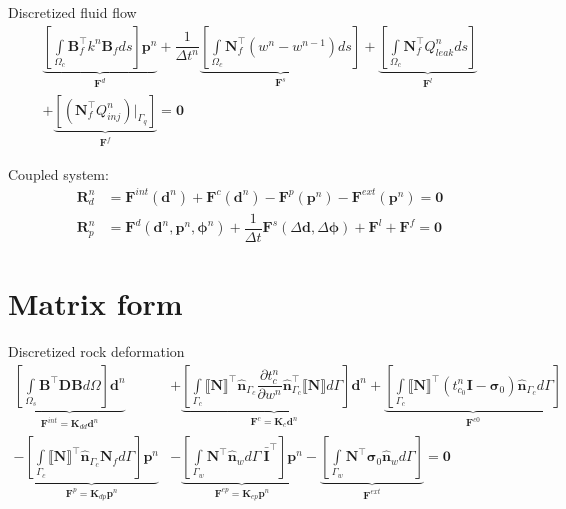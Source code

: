 \documentclass{article}
\begin{document}
Discretized fluid flow
\begin{equation}
\begin{gathered}
\underbrace{\left[\int\limits_{\Omega_c}
	\mathbf{B}_f^\top k^n \mathbf{B}_f ds \right] \mathbf{p}^n
	}_{\mathbf{F}^d}
+
\dfrac{1}{\Delta t^n}
\underbrace{\left[
	\int\limits_{\Omega_c} \mathbf{N}_f^\top (w^n - w^{n-1})  ds 
	\right]}_{\mathbf{F}^s}
+
\underbrace{\left[
	\int\limits_{\Omega_c} \mathbf{N}_f^{\top} Q_{leak}^n ds
	\right]}_{\mathbf{F}^l}
	\\
+
\underbrace{\left[
	\left(\mathbf{N}_f^{\top} Q_{inj}^n \right) \Big\rvert_{\Gamma_q} 
	\right]}_{\mathbf{F}^f}
= \mathbf{0} 
\end{gathered}
\end{equation}


Coupled system: 
	\begin{equation}
\begin{aligned}
\mathbf{R}_d^n &= \mathbf{F}^{int}(\mathbf{d}^n) 
+ \mathbf{F}^{c}(\mathbf{d}^n) 
- \mathbf{F}^{p}(\mathbf{p}^n) 
- \mathbf{F}^{ext}(\mathbf{p}^n) = \mathbf{0}\\
\mathbf{R}_p^n &= \mathbf{F}^{d}(\mathbf{d}^n, \mathbf{p}^n, \boldsymbol{\phi}^n) 
+ \dfrac{1}{\Delta t} \mathbf{F}^{s}(\Delta\mathbf{d}, \Delta \boldsymbol\phi)
+\mathbf{F}^{l} 
+ \mathbf{F}^{f} = \mathbf{0}
\end{aligned}
\label{eqn:system}
\end{equation}

\section{Matrix form}

Discretized rock deformation	
\begin{equation}
\begin{aligned}
\underbrace{\left[\int\limits_{\Omega_s} \mathbf{B}^{\top} \mathbf{D} \mathbf{B} d\Omega \right] \mathbf{d}^n}_{\mathbf{F}^{int} = \mathbf{K}_{dd} \mathbf{d}^n}
&+ 
\underbrace{
	\left[\int\limits_{\Gamma_{c}} \llbracket \mathbf{N} \rrbracket^{\top} \hat{\mathbf{n}}_{\Gamma_c} \dfrac{\partial t_c^n}{\partial w^n} \hat{\mathbf{n}}_{\Gamma_c}^{\top}\llbracket \mathbf{N} \rrbracket 
	  d\Gamma \right]	\mathbf{d}^n
}_{\mathbf{F}^{c} = \mathbf{K}_c \mathbf{d}^n}
+ 
\underbrace{
	\left[\int\limits_{\Gamma_{c}} \llbracket \mathbf{N} \rrbracket^{\top} 
	\left( t_{c_0}^n \mathbf{I} - \boldsymbol\sigma_0   \right) \hat{\mathbf{n}}_{\Gamma_c}
	d\Gamma \right]
}_{\mathbf{F}^{c0}}
\\
- 
\underbrace{\left[\int\limits_{\Gamma_{c}} \llbracket \mathbf{N} \rrbracket ^{\top} \hat{\mathbf{n}}_{\Gamma_c} \mathbf{N}_f d\Gamma \right] \mathbf{p}^n
}_{\mathbf{F}^{p} = \mathbf{K}_{dp} \mathbf{p}^n}
&- 
\underbrace{\left[\int\limits_{\Gamma_w} \mathbf{N}^{\top} \hat{\mathbf{n}}_{w} d\Gamma \:
	\bar{\mathbf{I}}^{\top} \right]\mathbf{p}^n
}_{\mathbf{F}^{ep} = \mathbf{K}_{ep} \mathbf{p}^n}
	-
\underbrace{\left[
	\int\limits_{\Gamma_w} \mathbf{N}^{\top} \boldsymbol\sigma_0\hat{\mathbf{n}}_{w} d\Gamma
\right]
}_{\mathbf{F}^{ext}}
= \mathbf{0}
\end{aligned}
\end{equation}
\end{document}
